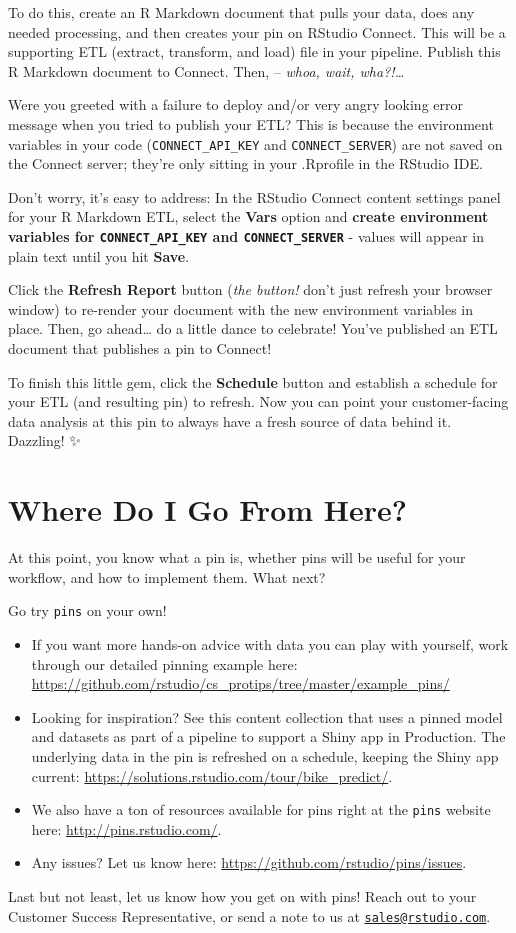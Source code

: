 \documentclass[
  twocolumn]{article}
\providecommand{\tightlist}{%
  \setlength{\itemsep}{0pt}\setlength{\parskip}{0pt}}
\begin{document}
To do this, create an R Markdown document that pulls your data, does any
needed processing, and then creates your pin on RStudio Connect. This
will be a supporting ETL (extract, transform, and load) file in your
pipeline. Publish this R Markdown document to Connect. Then, --
\emph{whoa, wait, wha?!\ldots{}}

Were you greeted with a failure to deploy and/or very angry looking
error message when you tried to publish your ETL? This is because the
environment variables in your code (\texttt{CONNECT\_API\_KEY} and
\texttt{CONNECT\_SERVER}) are not saved on the Connect server; they're
only sitting in your .Rprofile in the RStudio IDE.

Don't worry, it's easy to address: In the RStudio Connect content
settings panel for your R Markdown ETL, select the \textbf{Vars} option
and \textbf{create environment variables for \texttt{CONNECT\_API\_KEY}
and \texttt{CONNECT\_SERVER}} - values will appear in plain text until
you hit \textbf{Save}.

Click the \textbf{Refresh Report} button (\emph{the button!} don't just
refresh your browser window) to re-render your document with the new
environment variables in place. Then, go ahead\ldots{} do a little dance
to celebrate! You've published an ETL document that publishes a pin to
Connect!

To finish this little gem, click the \textbf{Schedule} button and
establish a schedule for your ETL (and resulting pin) to refresh. Now
you can point your customer-facing data analysis at this pin to always
have a fresh source of data behind it. Dazzling! ✨

\hypertarget{where-do-i-go-from-here}{%
\section{Where Do I Go From Here?}\label{where-do-i-go-from-here}}

At this point, you know what a pin is, whether pins will be useful for
your workflow, and how to implement them. What next?

Go try \texttt{pins} on your own!

\begin{itemize}
\tightlist
\item
  If you want more hands-on advice with data you can play with yourself,
  work through our detailed pinning example here:
  \url{https://github.com/rstudio/cs_protips/tree/master/example_pins/}
\item
  Looking for inspiration? See this content collection that uses a
  pinned model and datasets as part of a pipeline to support a Shiny app
  in Production. The underlying data in the pin is refreshed on a
  schedule, keeping the Shiny app current:
  \url{https://solutions.rstudio.com/tour/bike_predict/}.
\item
  We also have a ton of resources available for pins right at the
  \texttt{pins} website here: \url{http://pins.rstudio.com/}.
\item
  Any issues? Let us know here:
  \url{https://github.com/rstudio/pins/issues}.
\end{itemize}

Last but not least, let us know how you get on with pins! Reach out to
your Customer Success Representative, or send a note to us at
\href{mailto:sales@rstudio.com}{\nolinkurl{sales@rstudio.com}}.
\end{document}
